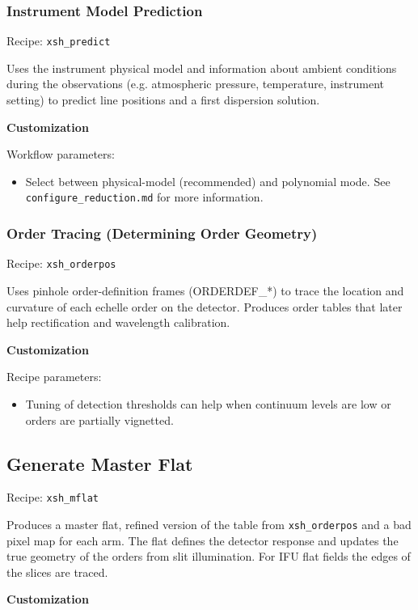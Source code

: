 \subsubsection{Instrument Model Prediction}

Recipe: {\tt xsh\_predict}

Uses the instrument physical model and information about 
ambient conditions during the observations 
(e.g. atmospheric  pressure, temperature, instrument setting)
to predict line positions and a first dispersion solution.

\bigskip
{\bf Customization}
\bigskip

Workflow parameters:
\begin{itemize}
\item Select between physical-model (recommended) and polynomial mode. 
See {\tt configure\_reduction.md} for more information.
\end{itemize}

\subsubsection{Order Tracing (Determining Order Geometry)}

Recipe: {\tt xsh\_orderpos}

Uses pinhole order-definition frames (ORDERDEF\_*) 
to trace the location and curvature of each echelle order on the detector. 
Produces order tables that later help rectification and wavelength calibration.

\bigskip
{\bf Customization}
\bigskip

Recipe parameters:
\begin{itemize}
\item Tuning of detection thresholds can help when continuum levels are low or orders are partially vignetted.
\end{itemize}

\subsection{Generate Master Flat}

Recipe: {\tt xsh\_mflat}

Produces a master flat,
refined version of the table from {\tt xsh\_orderpos}
and a bad pixel map for each arm. 
The flat defines the detector response and 
updates the true geometry of the orders from slit illumination.
For IFU flat fields the edges of the slices are traced.

\bigskip
{\bf Customization}
\bigskip

